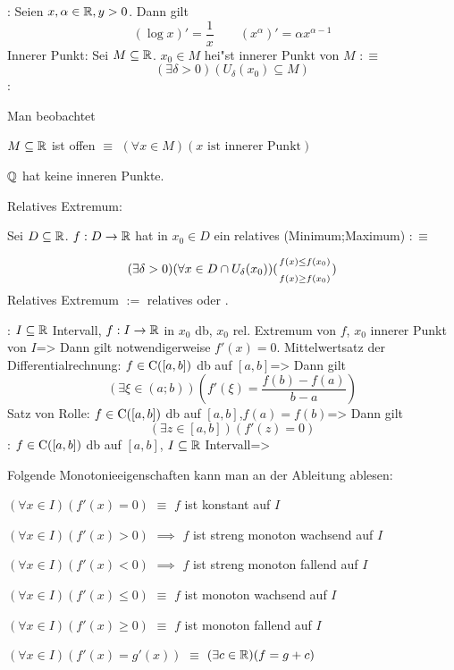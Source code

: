\example:{
  Seien $x,\alpha\in\mathbb R,y>0$. Dann gilt 
  \[(\log x)'=\frac 1 x \qquad
    (x^\alpha)'=\alpha x^{\alpha-1}
    \]
  }
 Innerer Punkt:{
  Sei $M\subseteq\mathbb R$. $x_0\in M$ hei"st innerer Punkt von $M$ $:\equiv$
  \[(\exists \delta>0)(U_\delta(x_0)\subseteq M)
    \]
  }
\remark:{
  Man beobachtet
  \begin{stmts}
    \item $ M\subseteq\mathbb R$ ist offen $\equiv$
      $(\forall x\in M)(\text{$x$ ist innerer Punkt})$
    \item $\mathbb Q$ hat keine inneren Punkte.
    \end{stmts}
  }
 Relatives Extremum:{
  Sei $D\subseteq\mathbb R$. $f:D\to\mathbb R$ hat in $x_0\in D$ ein relatives
  \tstack(Minimum;Maximum) $:\equiv$
  
  \[(\exists \delta>0)(\forall x\in D \cap U_\delta(x_0))
    (\stack({f(x)\le f(x_0)};{f(x)\ge f(x_0)}))
    \]
  Relatives Extremum $:=$ relatives  oder .
  }
\theorem:
  $I\subseteq\mathbb R$ Intervall, $f:I\to\mathbb R$ in $x_0$ db, $x_0$ rel.
  Extremum von $f$, $x_0$ innerer Punkt von $I$=>{
  Dann gilt notwendigerweise $f'(x)=0$.
  }
\theorem Mittelwertsatz der Differentialrechnung:
  $f\in{\rm C}([a,b])$ db auf $[a,b]$=>{
  Dann gilt
  \[(\exists \xi\in(a;b))(f'(\xi)=\frac{f(b)-f(a)}{b-a})
    \]
  }
\lessertheorem Satz von Rolle:
  $f\in{\rm C}([a,b])$ db auf $[a,b]$,$f(a)=f(b)$=>{
  Dann gilt
  \[(\exists z\in [a,b])(f'(z)=0)
    \]
  }
\theorem:
  $f\in{\rm C}([a,b])$ db auf $[a,b]$, $I\subseteq\mathbb R$ Intervall=>{
  Folgende Monotonieeigenschaften kann man an der Ableitung ablesen:
  \begin{stmts}
    \item $(\forall x\in I)(f'(x)=0)$ $\equiv$ $f$ ist konstant auf $I$
    \item $(\forall x\in I)(f'(x)>0)$ $\implies$ $f$ ist streng monoton wachsend auf $I$
    \item $(\forall x\in I)(f'(x)<0)$ $\implies$ $f$ ist streng monoton fallend auf $I$
    \item $(\forall x\in I)(f'(x)\le 0)$ $\equiv$ $f$ ist monoton wachsend auf $I$
    \item $(\forall x\in I)(f'(x)\ge 0)$ $\equiv$ $f$ ist monoton fallend auf $I$
    \item $(\forall x\in I)(f'(x)=g'(x))$ $\equiv$ $(\exists c\in\mathbb R)(f=g+c)$
    \end{stmts}
  }
